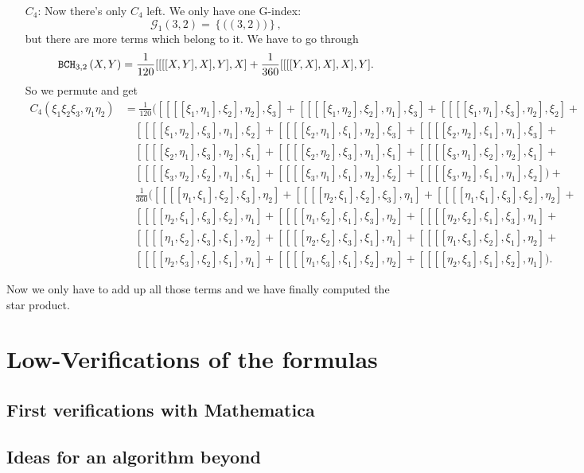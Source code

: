 \begin{itemize}
	\item[$C_4$:]
	Now there's only $C_4$ left. We only have one G-index:
	\begin{equation*}
		\mathcal{G}_1(3,2) 
		= 
		\left\{ \big( (3,2) \big) \right\},
	\end{equation*}
	but there are more terms which belong to it. We have to go through
	\begin{equation*}
		\mathtt{BCH}_{3, 2}\left(X, Y\right)
		=
		\frac{1}{120} [[[[X,Y],X],Y],X] +
		\frac{1}{360} [[[[Y,X],X],X],Y].
	\end{equation*}
	So we permute and get
	\begin{align*}
		C_4(\xi_1 \xi_2 \xi_3, \eta_1 \eta_2)
		& =
		\frac{1}{120} 
		\big( 
			[[[[\xi_1, \eta_1], \xi_2], \eta_2], \xi_3] + 
			[[[[\xi_1, \eta_2], \xi_2], \eta_1], \xi_3] + 
			[[[[\xi_1, \eta_1], \xi_3], \eta_2], \xi_2] +
		\\
		& \quad
			[[[[\xi_1, \eta_2], \xi_3], \eta_1], \xi_2] + 
			[[[[\xi_2, \eta_1], \xi_1], \eta_2], \xi_3] + 
			[[[[\xi_2, \eta_2], \xi_1], \eta_1], \xi_3] +
		\\
		& \quad
			[[[[\xi_2, \eta_1], \xi_3], \eta_2], \xi_1] + 
			[[[[\xi_2, \eta_2], \xi_3], \eta_1], \xi_1] + 
			[[[[\xi_3, \eta_1], \xi_2], \eta_2], \xi_1] +
		\\
		& \quad
			[[[[\xi_3, \eta_2], \xi_2], \eta_1], \xi_1] + 
			[[[[\xi_3, \eta_1], \xi_1], \eta_2], \xi_2] + 
			[[[[\xi_3, \eta_2], \xi_1], \eta_1], \xi_2] 
		\big) +
		\\
		& \quad
		\frac{1}{360} 
		\big( 
			[[[[\eta_1, \xi_1], \xi_2], \xi_3], \eta_2] + 
			[[[[\eta_2, \xi_1], \xi_2], \xi_3], \eta_1] + 
			[[[[\eta_1, \xi_1], \xi_3], \xi_2], \eta_2] +
		\\
		& \quad
			[[[[\eta_2, \xi_1], \xi_3], \xi_2], \eta_1] + 
			[[[[\eta_1, \xi_2], \xi_1], \xi_3], \eta_2] + 
			[[[[\eta_2, \xi_2], \xi_1], \xi_3], \eta_1] +
		\\
		& \quad
			[[[[\eta_1, \xi_2], \xi_3], \xi_1], \eta_2] + 
			[[[[\eta_2, \xi_2], \xi_3], \xi_1], \eta_1] + 
			[[[[\eta_1, \xi_3], \xi_2], \xi_1], \eta_2] +
		\\
		& \quad
			[[[[\eta_2, \xi_3], \xi_2], \xi_1], \eta_1] + 
			[[[[\eta_1, \xi_3], \xi_1], \xi_2], \eta_2] + 
			[[[[\eta_2, \xi_3], \xi_1], \xi_2], \eta_1] 
		\big).
	\end{align*}
\end{itemize}
Now we only have to add up all those terms and we have finally computed the 
star product.




\section{Low-Verifications of the formulas}
\label{sec:chap4_Mathematica}

\subsection{First verifications with Mathematica}

\subsection{Ideas for an algorithm beyond}
